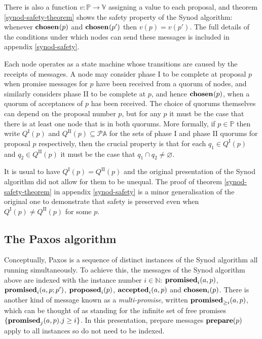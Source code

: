 \documentclass[journal]{IEEEtran}
\begin{document}
There is also a function $v : \mathbb P \to \mathbb V$ assigning a value to
each proposal, and theorem \ref{synod-safety-theorem} shows the safety property
of the Synod algorithm: whenever $\mathbf{chosen}_{}(p)$ and $\mathbf{chosen}_{}(p')$ then $v(p)
= v(p')$. The full details of the conditions under which nodes can send these
messages is included in appendix \ref{synod-safety}.

Each node operates as a state machine whose transitions are caused by the
receipts of messages. A node may consider phase I to be complete at proposal
$p$ when promise messages for $p$ have been received from a quorum of nodes,
and similarly considers phase II to be complete at $p$, and hence
$\mathbf{chosen}_{}(p)$, when a quorum of acceptances of $p$ has been received. The
choice of quorums themselves can depend on the proposal number $p$, but for any
$p$ it must be the case that there is at least one node that is in both
quorums. More formally, if $p \in \mathbb P$ then write $Q^\textrm{I}(p)$ and
$Q^\textrm{II}(p) \subseteq \mathcal P \mathbb A$ for the sets of phase I and
phase II quorums for proposal $p$ respectively, then the crucial property is
that for each $q_1 \in Q^\textrm{I}(p)$ and $q_2 \in Q^\textrm{II}(p)$ it must
be the case that $q_1 \cap q_2 \ne \varnothing$.

It is usual to have $Q^\textrm{I}(p) = Q^\textrm{II}(p)$ and the original
presentation of the Synod algorithm did not allow for them to be unequal. The
proof of theorem \ref{synod-safety-theorem} in appendix \ref{synod-safety} is a
minor generalisation of the original one to demonstrate that safety is
preserved even when $Q^\textrm{I}(p) \ne Q^\textrm{II}(p)$ for some $p$.

\subsection{The Paxos algorithm}

Conceptually, Paxos is a sequence of distinct instances of the Synod algorithm
all running simultaneously. To achieve this, the messages of the Synod
algorithm above are indexed with the instance number $i \in \mathbb N$:
$\mathbf{promised}_{i}(a,p)$, $\mathbf{promised}_{i}(a,p;p')$, $\mathbf{proposed}_{i}(p)$, $\mathbf{accepted}_{i}(a,p)$ and
$\mathbf{chosen}_{i}(p)$. There is another kind of message known as a
\textit{multi-promise}, written $\mathbf{promised}_{\ge i}(a,p)$, which can be thought of as
standing for the infinite set of free promises $\{ \mathbf{promised}_{j}(a,p). j \ge i
\}$. In this presentation, prepare messages $\mathbf{prepare}(p)$ apply to all instances
so do not need to be indexed.
\end{document}
